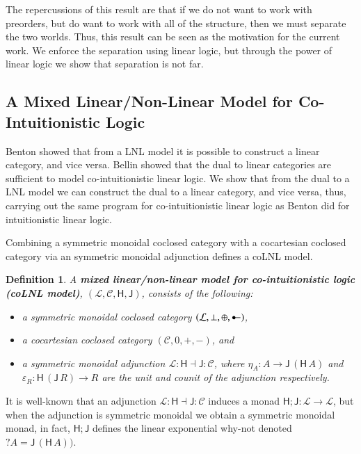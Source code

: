 \documentclass{lmcs}
\newtheorem{definition}[theorem]{Definition}
\let\mto\to
\let\to\relax
\newcommand{\to}{\rightarrow}
\newcommand{\cat}[1]{\mathcal{#1}}
\newcommand{\func}[1]{\mathsf{#1}}
\newcommand{\colimp}[0]{\multimapdotinv}
\begin{document}
The repercussions of this result are that if we do not want to work
with preorders, but do want to work with all of the structure, then we
must separate the two worlds.  Thus, this result can be seen as the
motivation for the current work.  We enforce the separation using
linear logic, but through the power of linear logic we show that
separation is not far.

\subsection{A Mixed Linear/Non-Linear Model for Co-Intuitionistic Logic}
\label{subsec:a_mixed_linear/non-linear_model_for_co-intuitionistic_logic}

Benton \cite{Benton:1994} showed that from a LNL model it is possible
to construct a linear category, and vice versa.  Bellin
\cite{Bellin:2012} showed that the dual to linear categories are
sufficient to model co-intuitionistic linear logic. We show that from
the dual to a LNL model we can construct the dual to a linear
category, and vice versa, thus, carrying out the same program for
co-intuitionistic linear logic as Benton did for intuitionistic linear
logic.

Combining a symmetric monoidal coclosed category with a cocartesian
coclosed category via an symmetric monoidal adjunction defines a coLNL
model.
\begin{definition}
  \label{def:coLNL-model}
  A
  \textbf{mixed linear/non-linear model for co-intuitionistic logic (coLNL model)},
  $(\cat{L},\cat{C},\func{H},\func{J})$, consists of the following:
  \begin{itemize}
  \item[i.] a symmetric monoidal coclosed category $(\cat{L},\perp,\oplus,\colimp)$,
  \item[ii.] a cocartesian coclosed category $(\cat{C},0,+,-)$, and
  \item[iv.] a symmetric monoidal adjunction $\cat{L} : \func{H}
    \dashv \func{J} : \cat{C}$, where $\eta_A : A \mto
    \func{J}\,(\func{H}\,A)$ and $\varepsilon_R :
    \func{H}\,(\func{J}\,R) \mto R$ are the unit and counit of the adjunction
    respectively.
  \end{itemize}
\end{definition}
It is well-known that an adjunction $\cat{L} : \func{H} \dashv
\func{J} : \cat{C}$ induces a monad $\func{H};\func{J} : \cat{L} \mto
\cat{L}$, but when the adjunction is symmetric monoidal we obtain a
symmetric monoidal monad, in fact, $\func{H};\func{J}$ defines the
linear exponential why-not denoted $?A = \func{J}\,(\func{H}\,A))$.
\end{document}
